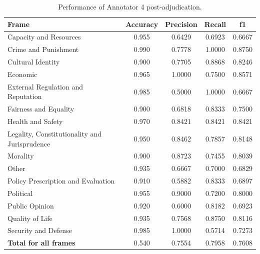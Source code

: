 \documentclass[
10pt, %
a4paper, %
oneside, %
headinclude,footinclude, %
] {book}%
\begin{document}
\begin{table}[htbp]
\small
\centering
\begin{tabular}{|l|c|c|c|c|}
\hline
\textbf{Frame} & \textbf{Accuracy} & \textbf{Precision} & \textbf{Recall} & \textbf{f1} \\
\hline
Capacity and Resources & 0.955 & 0.6429 & 0.6923 & 0.6667 \\\hline
Crime and Punishment & 0.990 & 0.7778 & 1.0000 & 0.8750 \\\hline
Cultural Identity & 0.900 & 0.7705 & 0.8868 & 0.8246 \\\hline
Economic & 0.965 & 1.0000 & 0.7500 & 0.8571 \\\hline
External Regulation and Reputation & 0.985 & 0.5000 & 1.0000 & 0.6667 \\\hline
Fairness and Equality & 0.900 & 0.6818 & 0.8333 & 0.7500 \\\hline
Health and Safety & 0.970 & 0.8421 & 0.8421 & 0.8421 \\\hline
Legality, Constitutionality and Jurisprudence & 0.950 & 0.8462 & 0.7857 & 0.8148 \\\hline
Morality & 0.900 & 0.8723 & 0.7455 & 0.8039 \\\hline
Other & 0.935 & 0.6667 & 0.7000 & 0.6829 \\\hline
Policy Prescription and Evaluation & 0.910 & 0.5882 & 0.8333 & 0.6897 \\\hline
Political & 0.955 & 0.9000 & 0.7200 & 0.8000 \\\hline
Public Opinion & 0.920 & 0.6000 & 0.8182 & 0.6923 \\\hline
Quality of Life & 0.935 & 0.7568 & 0.8750 & 0.8116 \\\hline
Security and Defense & 0.985 & 1.0000 & 0.5714 & 0.7273 \\
\hline
\textbf{Total for all frames} & 0.540 & 0.7554 & 0.7958 & 0.7608 \\
\hline
\end{tabular}
\caption{Performance of Annotator 4 post-adjudication.}
\label{tab:post_annotator4_performance}
\end{table}
\end{document}
